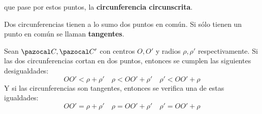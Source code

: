                                                                                                                                                                                                                                                                                                                                                                                                                                                                                                                                                                                                                                                                                                                                                                                                                                                                                                                                                                                                                                                                                                                                                                                                                                                                                                                                                                                                                                                                                                                                                                                                                                                                     que pase por estos puntos, la \textbf{circunferencia circunscrita}.

 Dos circunferencias tienen a lo sumo dos puntos en común. Si sólo tienen un punto en común se llaman \textbf{tangentes}.

  Sean $\C, \C'$ con centros $O, O'$ y radios $\rho, \rho'$ respectivamente. Si las dos circunferencias cortan en dos puntos, entonces se cumplen las siguientes desigualdades:
$$OO' < \rho+\rho' \quad \rho < OO'+\rho' \quad \rho' < OO' + \rho$$
Y si las circunferencias son tangentes, entonces se verifica una de estas igualdades:
$$OO' = \rho+\rho' \quad \rho = OO'+\rho' \quad \rho' =   OO' + \rho$$      

